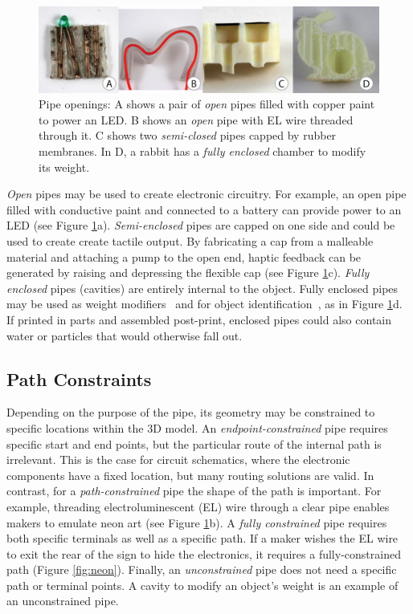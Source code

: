 \begin{figure}[t]
\centering
    \includegraphics[width=1.0\columnwidth]{figures/types.png}
\caption{Pipe openings: A shows a pair of \emph{open} pipes filled with copper paint to power an LED.  B shows an \emph{open} pipe with EL wire threaded through it.  C shows two \emph{semi-closed} pipes capped by rubber membranes.  In D, a rabbit has a \emph{fully enclosed} chamber to modify its weight.}
\label{fig:openings}
\end{figure}

\emph{Open} pipes may be used to create electronic circuitry.  For example, an open pipe filled with conductive paint and connected to a battery can provide power to an LED (see Figure \ref{fig:openings}a).
%
\emph{Semi-enclosed} pipes are capped on one side and could be used to create create tactile output. By fabricating a cap from a malleable material and attaching a pump to the open end, haptic feedback can be generated by raising and depressing the flexible cap (see Figure \ref{fig:openings}c).
%
\emph{Fully enclosed} pipes (cavities) are entirely internal to the object.  Fully enclosed pipes may be used as weight modifiers~\cite{Prevost-makeitstand} and for object identification~\cite{Willis-infrastructs}, as in Figure \ref{fig:openings}d.  If printed in parts and assembled post-print, enclosed pipes could also contain water or particles that would otherwise fall out.

\subsection{Path Constraints}
Depending on the purpose of the pipe, its geometry may be constrained to specific locations within the 3D model. An \emph{endpoint-constrained} pipe requires specific start and end points, but the particular route of the internal path is irrelevant. This is the case for circuit schematics, where the electronic components have a fixed location, but many routing solutions are valid. In contrast, for a \emph{path-constrained} pipe the shape of the path is important. For example, threading electroluminescent (EL) wire through a clear pipe enables makers to emulate neon art (see Figure \ref{fig:openings}b). A \emph{fully constrained} pipe requires both specific terminals as well as a specific path. If a maker wishes the EL wire to exit the rear of the sign to hide the electronics, it requires a fully-constrained path (Figure \ref{fig:neon}). Finally, an \emph{unconstrained} pipe does not need a specific path or terminal points. A cavity to modify an object's weight is an example of an unconstrained pipe.

